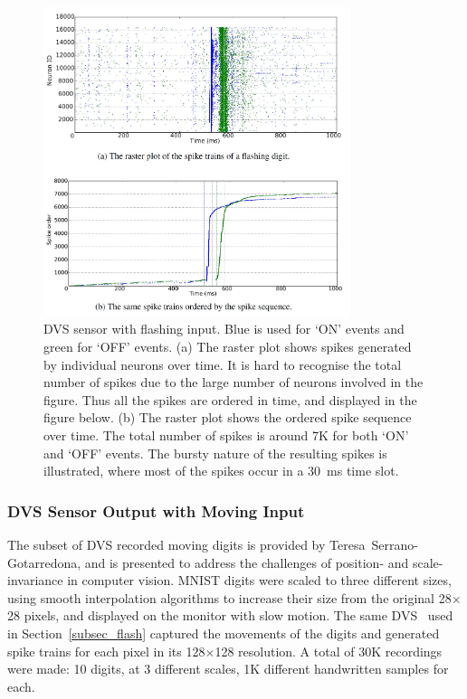\begin{figure}[tbh!]
	\centering
	\includegraphics[width=0.8\textwidth]{pics_bench/fig5.jpg}	
	\caption[DVS sensor with flashing input.]{DVS sensor with flashing input.
		Blue is used for `ON' events and green for `OFF' events.
		(a) The raster plot shows spikes generated by individual neurons over time.
		It is hard to recognise the total number of spikes due to the large number of neurons involved in the figure.
		Thus all the spikes are ordered in time, and displayed in the figure below.
		(b) The raster plot shows the ordered spike sequence over time.
		The total number of spikes is around 7K for both `ON' and `OFF' events.
		The bursty nature of the resulting spikes is illustrated, where most of the spikes occur in a 30~ms time slot.}
	\label{fig:flash}
\end{figure}

\subsubsection{DVS Sensor Output with Moving Input}

The subset of DVS recorded moving digits is provided by Teresa~Serrano-Gotarredona, and is  presented to address the challenges of position- and scale- invariance in computer vision.
MNIST digits were scaled to three different sizes, using smooth interpolation algorithms to increase their size from the original 28$\times$28 pixels, and displayed on the monitor with slow motion. 
The same DVS~\citep{serrano2013128} used in Section~\ref{subsec_flash} captured the movements of the digits and generated spike trains for each pixel in its 128$\times$128 resolution.
A total of 30K recordings were made: 10 digits, at 3 different scales, 1K different handwritten samples for each.

